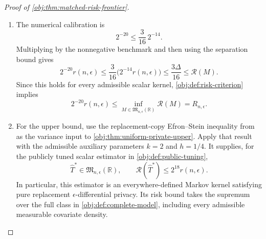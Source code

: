 \begin{proof}[Proof of \cref{obj:thm:matched-risk-frontier}]
\begin{enumerate}
In the first case take \(\eta=0\), and in the second take \(\eta=1\). The absolute loss is at least \(\Delta/2\) on the corresponding error event, so
\[
\int_{\mathbb R}|u-\eta\Delta|\,d\mathsf L_\eta(u)
\ge
\frac{\Delta}{2}\mathsf L_\eta(\mathcal E_\eta)
\ge
\frac{\Delta}{2}\frac38
=
\frac{3\Delta}{16}.
\]

Finite-prior averaging and the common target within each family give
\[
\begin{aligned}
\int_{\mathbb R}|u-\eta\Delta|\,d\mathsf L_\eta(u)
&=
\frac{1}{N_{\mathrm{prior},\eta}}
\sum_{\iota=1}^{N_{\mathrm{prior},\eta}}
E_{(P_{\eta,\iota}^{\mathrm{obs}})^{\otimes n},M}
|M(D)-\theta(P_{\eta,\iota})|\\
&\le
\frac{1}{N_{\mathrm{prior},\eta}}
\sum_{\iota=1}^{N_{\mathrm{prior},\eta}}\mathcal R(M)
=
\mathcal R(M).
\end{aligned}
\]
These identities and inequalities concern nonnegative extended integrals and remain valid when a risk is infinite. In either case,
\[
\frac{3\Delta}{16}\le\mathcal R(M).
\]

\item The numerical calibration is
\[
2^{-20}\le\frac{3}{16}\,2^{-14}.
\]
Multiplying by the nonnegative benchmark and then using the separation bound gives
\[
2^{-20}r(n,\epsilon)
\le
\frac{3}{16}\bigl(2^{-14}r(n,\epsilon)\bigr)
\le
\frac{3\Delta}{16}
\le
\mathcal R(M).
\]
Since this holds for every admissible scalar kernel, \cref{obj:def:risk-criterion} implies
\[
2^{-20}r(n,\epsilon)
\le
\inf_{M\in\mathfrak M_{n,\epsilon}(\mathbb R)}\mathcal R(M)
=
R_{n,\epsilon}.
\]

\item For the upper bound, use the replacement-copy Efron--Stein inequality from \citep[Theorem 3.1, p.~54]{BoucheronLugosiMassart2013} as the variance input to \cref{obj:thm:uniform-private-upper}. Apply that result with the admissible auxiliary parameters \(k=2\) and \(h=1/4\). It supplies, for the publicly tuned scalar estimator in \cref{obj:def:public-tuning},
\[
\widehat T^*\in\mathfrak M_{n,\epsilon}(\mathbb R),
\qquad
\mathcal R(\widehat T^*)\le2^{18}r(n,\epsilon).
\]
In particular, this estimator is an everywhere-defined Markov kernel satisfying pure replacement \(\epsilon\)-differential privacy. Its risk bound takes the supremum over the full class in \cref{obj:def:complete-model}, including every admissible measurable covariate density.


\end{enumerate}
\end{proof}
